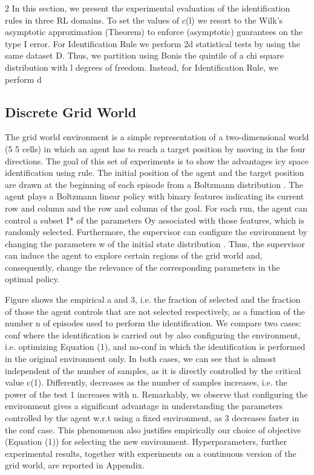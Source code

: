\documentclass{article}
\begin{document}
\begin{paracol}{2}
In this section, we present the experimental evaluation of the
identification rules in three RL domains. To set the values of
c(l) we resort to the Wilk's asymptotic approximation (Theorem) to enforce (asymptotic) guarantees on the type I error. For Identification Rule we perform 2d statistical tests by
using the same dataset D. Thus, we partition  using Bonis the quintile of a chi square distribution with l degrees
of freedom. Instead, for Identification Rule, we perform d


\subsection*{Discrete Grid World}


The grid world environment is a simple representation of a
two-dimensional world (5  5 cells) in which an agent has to
reach a target position by moving in the four directions. The
goal of this set of experiments is to show the advantages
icy space identification using rule. The initial position of the
agent and the target position are drawn at the beginning of
each episode from a Boltzmann distribution . The agent
plays a Boltzmann linear policy  with binary features  indicating its current row and column and the row and column
of the goal. For each run, the agent can control a subset I*
of the parameters Oy associated with those features, which
is randomly selected. Furthermore, the supervisor can configure the environment by changing the parameters w of the
initial state distribution . Thus, the supervisor can induce
the agent to explore certain regions of the grid world and,
consequently, change the relevance of the corresponding parameters in the optimal policy.

\switchcolumn
\RaggedRight

Figure shows the empirical a and 3, i.e. the fraction of
selected and the fraction of those the agent controls that are
not selected respectively, as a function of the number n of
episodes used to perform the identification. We compare two
cases: conf where the identification is carried out by also
configuring the environment, i.e. optimizing Equation (1),
and no-conf in which the identification is performed in the
original environment only. In both cases, we can see that
 is almost independent of the number of samples, as it is
directly controlled by the critical value c(1). Differently, 
decreases as the number of samples increases, i.e. the power
of the test 1   increases with n. Remarkably, we observe
that configuring the environment gives a significant advantage in understanding the parameters controlled by the agent
w.r.t using a fixed environment, as 3 decreases faster in the
conf case. This phenomenon also justifies empirically our
choice of objective (Equation (1)) for selecting the new environment. Hyperparameters, further experimental results, together with experiments on a continuous version of the grid
world, are reported in Appendix.



\end{paracol}
\end{document}
